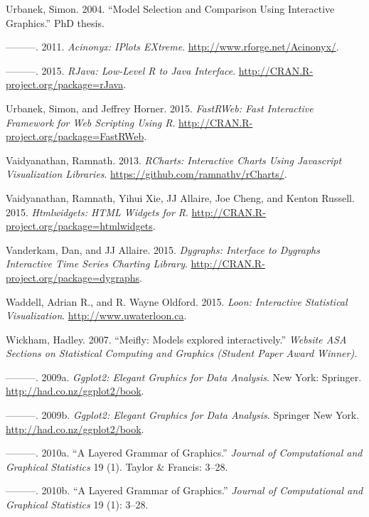 \documentclass[12pt,]{isuthesis}
\begin{document}
\hypertarget{ref-Urbanek:2004}{}
Urbanek, Simon. 2004. ``Model Selection and Comparison Using Interactive
Graphics.'' PhD thesis.

\hypertarget{ref-iPlots}{}
---------. 2011. \emph{Acinonyx: IPlots EXtreme}.
\url{http://www.rforge.net/Acinonyx/}.

\hypertarget{ref-rJava}{}
---------. 2015. \emph{RJava: Low-Level R to Java Interface}.
\url{http://CRAN.R-project.org/package=rJava}.

\hypertarget{ref-FastRWeb}{}
Urbanek, Simon, and Jeffrey Horner. 2015. \emph{FastRWeb: Fast
Interactive Framework for Web Scripting Using R}.
\url{http://CRAN.R-project.org/package=FastRWeb}.

\hypertarget{ref-rCharts}{}
Vaidyanathan, Ramnath. 2013. \emph{RCharts: Interactive Charts Using
Javascript Visualization Libraries}.
\url{https://github.com/ramnathv/rCharts/}.

\hypertarget{ref-htmlwidgets}{}
Vaidyanathan, Ramnath, Yihui Xie, JJ Allaire, Joe Cheng, and Kenton
Russell. 2015. \emph{Htmlwidgets: HTML Widgets for R}.
\url{http://CRAN.R-project.org/package=htmlwidgets}.

\hypertarget{ref-dygraphs}{}
Vanderkam, Dan, and JJ Allaire. 2015. \emph{Dygraphs: Interface to
Dygraphs Interactive Time Series Charting Library}.
\url{http://CRAN.R-project.org/package=dygraphs}.

\hypertarget{ref-loon}{}
Waddell, Adrian R., and R. Wayne Oldford. 2015. \emph{Loon: Interactive
Statistical Visualization}. \url{http://www.uwaterloon.ca}.

\hypertarget{ref-Wickham:2007wq}{}
Wickham, Hadley. 2007. ``Meifly: Models explored interactively.''
\emph{Website ASA Sections on Statistical Computing and Graphics
(Student Paper Award Winner)}.

\hypertarget{ref-ggplot2}{}
---------. 2009a. \emph{Ggplot2: Elegant Graphics for Data Analysis}.
New York: Springer. \url{http://had.co.nz/ggplot2/book}.

\hypertarget{ref-ggplot2-book}{}
---------. 2009b. \emph{Ggplot2: Elegant Graphics for Data Analysis}.
Springer New York. \url{http://had.co.nz/ggplot2/book}.

\hypertarget{ref-ggplot2-paper}{}
---------. 2010a. ``A Layered Grammar of Graphics.'' \emph{Journal of
Computational and Graphical Statistics} 19 (1). Taylor \& Francis:
3--28.

\hypertarget{ref-Wickham:2010hya}{}
---------. 2010b. ``A Layered Grammar of Graphics.'' \emph{Journal of
Computational and Graphical Statistics} 19 (1): 3--28.
\end{document}
